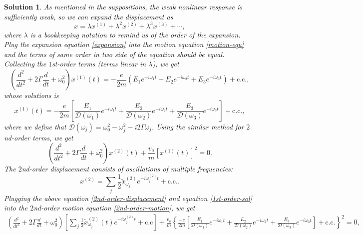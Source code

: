\documentclass[UTF8,10pt,a4paper]{article}
\theoremstyle{Problem}
\theoremstyle{Solution}
\newtheorem*{sol}{Solution}
\begin{document}
\begin{sol}
    As mentioned in the suppositions, the weak nonlinear response is sufficiently weak, so we can expand the displacement as
    \begin{equation}
        \label{expansion}
        x=\lambda x^{(1)}+\lambda^2x^{(2)}+\lambda^3x^{(3)}+\cdots,
    \end{equation}
    where $\lambda$ is a bookkeeping notation to remind us of the order of the expansion.
    Plug the expansion equation \eqref{expansion} into the motion equation \eqref{motion-equ} and the terms of same order in two side of the equation should be equal. Collecting the $1$st-order terms (terms linear in $\lambda$), we get
    \begin{equation}
        \left(\frac{d^2}{dt^2}+2\Gamma\frac{d}{dt}+\omega_0^2\right)x^{(1)}(t)=-\frac{e}{2m}\left(E_1e^{-i\omega_1t}+E_2e^{-i\omega_2t}+E_3e^{-i\omega_3t}\right)+\text{c.c.},
    \end{equation}
    whose solutions is
    \begin{equation}
        \label{1st-order-sol}
        x^{(1)}(t)=-\frac{e}{2m}\left[\frac{E_1}{\mathcal{D}(\omega_1)}e^{-i\omega_1t}+\frac{E_2}{\mathcal{D}(\omega_2)}e^{-i\omega_2t}+\frac{E_3}{\mathcal{D}(\omega_3)}e^{-i\omega_3t}\right]+\text{c.c.},
    \end{equation}
    where we define that $\mathcal{D}(\omega_j)=\omega_0^2-\omega_j^2-i2\Gamma\omega_j$.
    Using the similar method for $2$nd-order terms, we get
    \begin{equation}
        \label{2nd-order-motion}
        \left(\frac{d^2}{dt^2}+2\Gamma\frac{d}{dt}+\omega_0^2\right)x^{(2)}(t)+\frac{v_a}{m}\left[x^{(1)}(t)\right]^2=0.
    \end{equation}
    The $2$nd-order displacement consists of oscillations of multiple frequencies:
    \begin{equation}
        \label{2nd-order-displacement}
        x^{(2)}=\sum_j\frac{1}{2}\tilde{x}_{\omega_j}^{(2)}e^{-i\omega_j^{(2)}t}+\text{c.c.}.
    \end{equation}
    Plugging the above equation \eqref{2nd-order-displacement} and equation \eqref{1st-order-sol} into the $2$nd-order motion equation \eqref{2nd-order-motion}, we get
    \begin{gather}
        \left(\frac{d^2}{dt^2}+2\Gamma\frac{d}{dt}+\omega_0^2\right)\left[\sum_j\frac{1}{2}\tilde{x}_{\omega_j}^{(2)}(t)e^{-i\omega_j^{(2)}t}+\text{c.c}\right]+\frac{v_a}{m}\left\{\frac{-e}{2m}\left[\frac{E_1}{\mathcal{D}(\omega_1)}e^{-i\omega_1t}+\frac{E_2}{\mathcal{D}(\omega_2)}e^{-i\omega_2t}+\frac{E_3}{\mathcal{D}(\omega_3)}e^{-i\omega_3t}\right]+\text{c.c.}\right\}^2=0,\\

\end{gather}
\end{sol}
\end{document}
